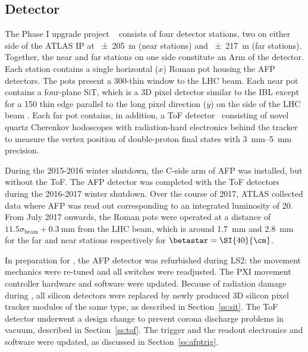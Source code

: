 \documentclass[cernpreprint, atlasdraft=false, UKenglish,british,orcidlogo, texmf, orcidlogo]{atlasdoc}
\begin{document}
 
\subsection{ Detector}\label{afp} 
The  Phase I upgrade project
~\cite{ATLAS-TDR-24} 
consists of four detector stations, two on either side of the ATLAS \gls{IP} at \SI{\pm205}{\m} (near stations) and \SI{\pm217}{\m} (far stations).
Together, the near and far stations on one side constitute an Arm of the detector.
Each station contains a single horizontal ($x$) Roman pot housing the \gls{AFP} detectors. The pots present a \SI{300}{\micron}-thin window to the \gls{LHC} beam. Each near pot contains a four-plane \gls{SiT}, which is a 3D pixel detector similar to the \gls{IBL} except for a \SI{150}{\micron} thin edge parallel to the long pixel direction ($y$) on the side of the \gls{LHC} beam \cite{Lange_2015,Lange_2016}. Each far pot contains, in addition, a \gls{ToF} detector~\cite{bib:AFP-ECR2016} consisting of novel quartz Cherenkov hodoscopes with radiation-hard electronics behind the tracker to measure the vertex position of double-proton final states with \SIrange{3}{5}{\mm} precision.
 
 
During the 2015-2016 winter shutdown, the C-side arm of \gls{AFP} was installed, but without the \gls{ToF}. The \gls{AFP} detector was completed with the \gls{ToF} detectors during the 2016-2017 winter shutdown.
Over the course of 2017, ATLAS collected data where \gls{AFP} was read out corresponding to an integrated luminosity of \SI{20}{\ifb}.
From July 2017 onwards, the Roman pots were operated at a distance of $11.5\sigma_{\mathrm{beam}}+\SI{0.3}{\mm}$ from the \gls{LHC} beam, which is around \SI{1.7}{\mm} and \SI{2.8}{\mm} for the far and near stations respectively for $\betastar=\SI{40}{\cm}$.
 
In preparation for \RunThr, the \gls{AFP} detector was refurbished during \gls{LS2}: the movement mechanics were re-tuned and all switches were readjusted. The \gls{PXI} movement controller hardware and software were updated.
Because of radiation damage during \RunTwo, all silicon detectors were replaced by newly produced 3D silicon pixel tracker modules of the same type, as described in Section~\ref{ss:sit}. The \gls{ToF} detector underwent a design change to prevent corona discharge problems in vacuum, described in Section~\ref{ss:tof}.
The trigger and the readout electronics and software were updated, as discussed in Section~\ref{ss:afptrig}.
 
\end{document}

